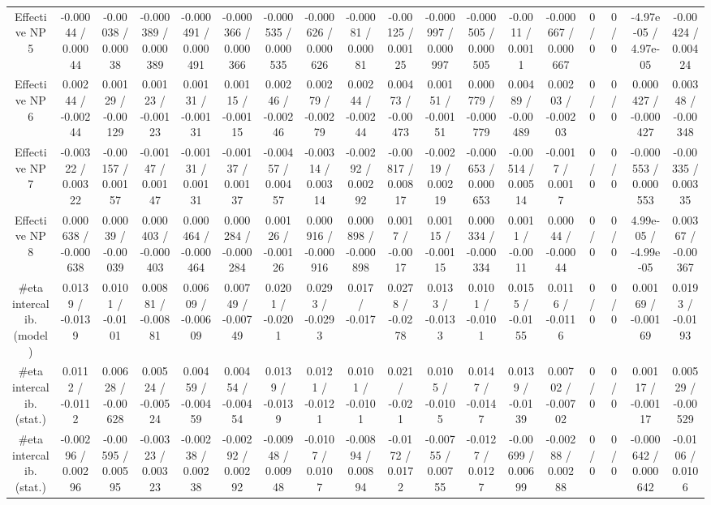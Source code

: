 \documentclass[10pt]{article}
\begin{document}
\begin{table}[htbp]
\begin{center}
\begin{tabular}{|c|c|c|c|c|c|c|c|c|c|c|c|c|c|c|c|c|c|}
  Effective NP 5 & -0.00044 / 0.00044 & -0.00038 / 0.00038 & -0.000389 / 0.000389 & -0.000491 / 0.000491 & -0.000366 / 0.000366 & -0.000535 / 0.000535 & -0.000626 / 0.000626 & -0.00081 / 0.00081 & -0.00125 / 0.00125 & -0.000997 / 0.000997 & -0.000505 / 0.000505 & -0.0011 / 0.0011 & -0.000667 / 0.000667 & 0 / 0 & 0 / 0 & -4.97e-05 / 4.97e-05 & -0.00424 / 0.00424 \\ 
  Effective NP 6 & 0.00244 / -0.00244 & 0.00129 / -0.00129 & 0.00123 / -0.00123 & 0.00131 / -0.00131 & 0.00115 / -0.00115 & 0.00246 / -0.00246 & 0.00279 / -0.00279 & 0.00244 / -0.00244 & 0.00473 / -0.00473 & 0.00151 / -0.00151 & 0.000779 / -0.000779 & 0.00489 / -0.00489 & 0.00203 / -0.00203 & 0 / 0 & 0 / 0 & 0.000427 / -0.000427 & 0.00348 / -0.00348 \\ 
  Effective NP 7 & -0.00322 / 0.00322 & -0.00157 / 0.00157 & -0.00147 / 0.00147 & -0.00131 / 0.00131 & -0.00137 / 0.00137 & -0.00457 / 0.00457 & -0.00314 / 0.00314 & -0.00292 / 0.00292 & -0.00817 / 0.00817 & -0.00219 / 0.00219 & -0.000653 / 0.000653 & -0.00514 / 0.00514 & -0.0017 / 0.0017 & 0 / 0 & 0 / 0 & -0.000553 / 0.000553 & -0.00335 / 0.00335 \\ 
  Effective NP 8 & 0.000638 / -0.000638 & 0.00039 / -0.00039 & 0.000403 / -0.000403 & 0.000464 / -0.000464 & 0.000284 / -0.000284 & 0.00126 / -0.00126 & 0.000916 / -0.000916 & 0.000898 / -0.000898 & 0.0017 / -0.0017 & 0.00115 / -0.00115 & 0.000334 / -0.000334 & 0.0011 / -0.0011 & 0.00044 / -0.00044 & 0 / 0 & 0 / 0 & 4.99e-05 / -4.99e-05 & 0.00367 / -0.00367 \\ 
  #eta intercalib. (model) & 0.0139 / -0.0139 & 0.0101 / -0.0101 & 0.00881 / -0.00881 & 0.00609 / -0.00609 & 0.00749 / -0.00749 & 0.0201 / -0.0201 & 0.0293 / -0.0293 & 0.017 / -0.017 & 0.0278 / -0.0278 & 0.0133 / -0.0133 & 0.0101 / -0.0101 & 0.0155 / -0.0155 & 0.0116 / -0.0116 & 0 / 0 & 0 / 0 & 0.00169 / -0.00169 & 0.0193 / -0.0193 \\ 
  #eta intercalib. (stat.) & 0.0112 / -0.0112 & 0.00628 / -0.00628 & 0.00524 / -0.00524 & 0.00459 / -0.00459 & 0.00454 / -0.00454 & 0.0139 / -0.0139 & 0.0121 / -0.0121 & 0.0101 / -0.0101 & 0.021 / -0.021 & 0.0105 / -0.0105 & 0.0147 / -0.0147 & 0.0139 / -0.0139 & 0.00702 / -0.00702 & 0 / 0 & 0 / 0 & 0.00117 / -0.00117 & 0.00529 / -0.00529 \\ 
  #eta intercalib. (stat.) & -0.00296 / 0.00296 & -0.00595 / 0.00595 & -0.00323 / 0.00323 & -0.00238 / 0.00238 & -0.00292 / 0.00292 & -0.00948 / 0.00948 & -0.0107 / 0.0107 & -0.00894 / 0.00894 & -0.0172 / 0.0172 & -0.00755 / 0.00755 & -0.0127 / 0.0127 & -0.00699 / 0.00699 & -0.00288 / 0.00288 & 0 / 0 & 0 / 0 & -0.000642 / 0.000642 & -0.0106 / 0.0106 \\ 

\end{tabular}
\end{center}
\end{table}
\end{document}
